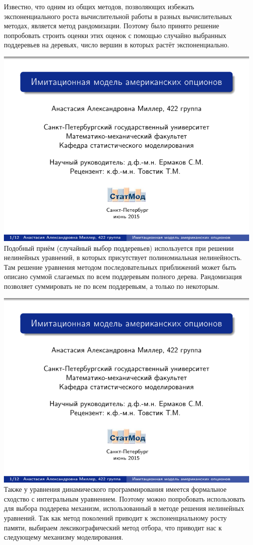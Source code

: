 \documentclass[14pt,a4paper]{extarticle}
\begin{document}
Известно, что одним из общих методов, позволяющих избежать экспоненциального роста вычислительной работы в разных вычислительных методах, является метод рандомизации. Поэтому было принято решение попробовать строить оценки этих оценок с помощью случайно  выбранных поддеревьев на деревьях, число вершин в которых растёт экспоненциально.

\includegraphics[page=\theslidenumber, width=\textwidth]{8th-semester-presentation.pdf}
Подобный приём (случайный выбор поддеревьев) используется при решении нелинейных уравнений, в которых присутствует полиномиальная нелинейность. Там решение уравнения методом последовательных приближений может быть описано суммой слагаемых по всем поддеревьям полного дерева. Рандомизация позволяет суммировать не по всем поддеревьям, а только по некоторым. 

\includegraphics[page=\theslidenumber, width=\textwidth]{8th-semester-presentation.pdf}
Также у уравнения динамического программирования имеется формальное сходство с интегральным уравнением. Поэтому можно попробовать использовать для выбора поддерева механизм, использованный в методе решения нелинейных уравнений. Так как метод поколений приводит к экспоненциальному росту памяти, выбираем лексикографический метод отбора, что приводит нас к следующему механизму моделирования.
\end{document}
